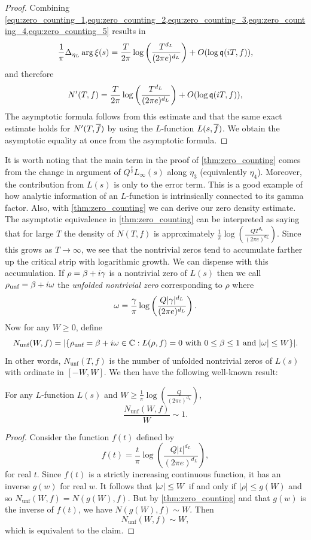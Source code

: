 \documentclass[12pt]{article}
\begin{document}
\begin{proof}
      Combining \cref{equ:zero_counting_1,equ:zero_counting_2,equ:zero_counting_3,equ:zero_counting_4,equ:zero_counting_5} results in
      \[
        \frac{1}{\pi}\Delta_{\eta_{L}}\arg\xi(s) = \frac{T}{2\pi}\log\left(\frac{T^{d_{L}}}{(2\pi e)^{d_{L}}}\right)+O(\log{\mathfrak{q}(iT,f)}),
      \]
      and therefore
      \[
        N'(T,f) = \frac{T}{2\pi}\log\left(\frac{T^{d_{L}}}{(2\pi e)^{d_{L}}}\right)+O(\log{\mathfrak{q}(iT,f)}),
      \]
      The asymptotic formula follows from this estimate and that the same exact estimate holds for \(N'(T,\overline{f})\) by using the \(L\)-function \(L(s,\overline{f})\). We obtain the asymptotic equality at once from the asymptotic formula.
    \end{proof}

    It is worth noting that the main term in the proof of \cref{thm:zero_counting} comes from the change in argument of \(Q^{\frac{s}{2}}L_{\infty}(s)\) along \(\eta_{3}\) (equivalently \(\eta_{4}\)). Moreover, the contribution from \(L(s)\) is only to the error term. This is a good example of how analytic information of an \(L\)-function is intrinsically connected to its gamma factor. Also, with \cref{thm:zero_counting} we can derive our zero density estimate. The asymptotic equivalence in \cref{thm:zero_counting} can be interpreted as saying that for large \(T\) the density of \(N(T,f)\) is approximately \(\frac{1}{\pi}\log\left(\frac{QT^{d_{L}}}{(2\pi e)^{d_{L}}}\right)\). Since this grows as \(T \to \infty\), we see that the nontrivial zeros tend to accumulate farther up the critical strip with logarithmic growth. We can dispense with this accumulation. If \(\rho = \beta+i\gamma\) is a nontrivial zero of \(L(s)\) then we call \(\rho_{\text{unf}} = \beta+i\omega\) the \textit{unfolded nontrivial zero} corresponding to \(\rho\) where
    \[
      \omega = \frac{\gamma}{\pi}\log\left(\frac{Q|\gamma|^{d_{L}}}{(2\pi e)^{d_{L}}}\right).
    \]
    Now for any \(W \ge 0\), define
    \[
      N_{\text{unf}}(W,f) = |\{\rho_{\text{unf}} = \beta+i\omega \in \mathbb{C}:L(\rho,f) = 0 \text{ with } 0 \le \beta \le 1 \text{ and } |\omega| \le W\}|.
    \]
    In other words, \(N_{\text{unf}}(T,f)\) is the number of unfolded nontrivial zeros of \(L(s)\) with ordinate in \([-W,W]\). We then have the following well-known result:

    \begin{proposition}\label{prop:unfolded_zeros_are_evenly_spaced}
    For any \(L\)-function \(L(s)\) and \(W \ge \frac{1}{\pi}\log\left(\frac{Q}{(2\pi e)^{d_{L}}}\right)\),
    \[
      \frac{N_{\text{unf}}(W,f)}{W} \sim 1.
    \]
    \end{proposition}
    \begin{proof}
      Consider the function \(f(t)\) defined by
      \[
        f(t) = \frac{t}{\pi}\log\left(\frac{Q|t|^{d_{L}}}{(2\pi e)^{d_{L}}}\right),
      \]
      for real \(t\). Since \(f(t)\) is a strictly increasing continuous function, it has an inverse \(g(w)\) for real \(w\). It follows that \(|\omega| \le W\) if and only if \(|\rho| \le g(W)\) and so \(N_{\text{unf}}(W,f) = N(g(W),f)\). But by \cref{thm:zero_counting} and that \(g(w)\) is the inverse of \(f(t)\), we have \(N(g(W),f) \sim W\). Then
      \[
        N_{\text{unf}}(W,f) \sim W,
      \]
      which is equivalent to the claim.
    \end{proof}
\end{document}

